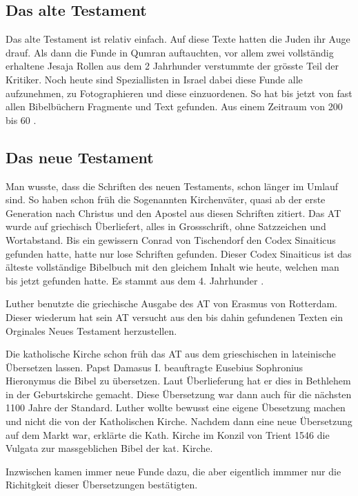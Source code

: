\subsection{Das alte Testament}
Das alte Testament ist relativ einfach. Auf diese Texte hatten die Juden ihr Auge drauf. Als dann die Funde in Qumran auftauchten, vor allem zwei vollständig erhaltene Jesaja Rollen aus dem 2 Jahrhunder \vChr{} verstummte der grösste Teil der Kritiker. Noch heute sind Speziallisten in Israel dabei diese Funde alle aufzunehmen, zu Fotographieren und diese einzuordenen. So hat bis jetzt von fast allen Bibelbüchern Fragmente und Text gefunden. Aus einem Zeitraum von 200 \vChr{} bis 60 \nChr{}.

\subsection{Das neue Testament}
Man wusste, dass die Schriften des neuen Testaments, schon länger im Umlauf sind. So haben schon früh die Sogenannten Kirchenväter, quasi ab der erste Generation nach Christus und den Apostel aus diesen Schriften zitiert.
Das AT wurde auf griechisch Überliefert, alles in Grossschrift, ohne Satzzeichen und Wortabstand. Bis ein gewissern Conrad von Tischendorf den Codex Sinaiticus gefunden hatte, hatte nur lose Schriften gefunden. Dieser Codex Sinaiticus ist das älteste vollständige Bibelbuch mit den gleichem Inhalt wie heute, welchen man bis jetzt gefunden hatte. Es stammt aus dem 4. Jahrhunder \nChr{}.

Luther benutzte die griechische Ausgabe des AT von Erasmus von Rotterdam. Dieser wiederum hat sein AT versucht aus den bis dahin gefundenen Texten ein Orginales Neues Testament herzustellen.

Die katholische Kirche schon früh das AT aus dem grieschischen in lateinische Übersetzen lassen. Papst Damasus I. beauftragte Eusebius Sophronius Hieronymus die Bibel zu übersetzen. Laut Überlieferung hat er dies in Bethlehem in der Geburtskirche gemacht. Diese Übersetzung war dann auch für die nächsten 1100 Jahre der Standard. Luther wollte bewusst eine eigene Übesetzung machen und nicht die von der Katholischen Kirche. Nachdem dann eine neue Übersetzung auf dem Markt war, erklärte die Kath. Kirche im Konzil von Trient 1546 die Vulgata zur massgeblichen Bibel der kat. Kirche.

Inzwischen kamen immer neue Funde dazu, die aber eigentlich immmer nur die Richitgkeit dieser Übersetzungen bestätigten.


